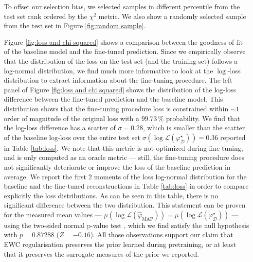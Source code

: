To offset our selection bias, we selected samples in different percentile from the
test set rank ordered by the $\chi^2$ metric. 
We also show a randomly selected sample from the test set in Figure \ref{fig:random sample}.


Figure \ref{fig:loss and chi squared} shows a comparison between 
the goodness of fit of the baseline model and the fine-tuned prediction. 
Since we empirically observe that the distribution of the loss on the test set (and the training set) follows a log-normal distribution, we find much more informative to look at the $\log$-loss 
distribution to extract information about the fine-tuning procedure. 
The left panel of Figure \ref{fig:loss and chi squared} 
shows the distribution of the log-loss difference between the fine-tuned prediction and the baseline model. This distribution shows that the fine-tuning procedure loss is constrained within $\sim 1$ order of magnitude of the original loss with a $99.73\,\%$ probability. We find that the log-loss difference has a scatter of $\sigma = 0.28$, which is smaller than the scatter of the baseline log-loss over the entire test set $\sigma(\log \mathcal{L}(\varphi^\star_{\mathcal{D}})) = 0.36$ reported in Table \ref{tab:loss}.
We note that this metric is not optimized during fine-tuning, 
and is only computed as an oracle metric --- still, the fine-tuning procedure does not significantly deteriorate or improve the loss of the baseline prediction in average. We report the first 2 moments of the loss log-normal distribution for the baseline and the fine-tuned reconstructions in Table \ref{tab:loss} in order to compare explicitly the loss distributions. As can be seen in this table, there is no significant difference between the two distribution. This statement can be proven for the measured mean values --- $\mu(\log \mathcal{L}(\hat{\varphi}_{\mathrm{MAP}})) = \mu(\log \mathcal{L}(\varphi^{\star}_{\mathcal{D}})) $ --- using the two-sided normal p-value test \citep{Casella2001}, which we find satisfy the null hypothesis with $p=0.87288$ ($Z = -0.16$). All those observations support our claim that EWC regularisation preserves the prior learned during pretraining, or at least that it preserves the surrogate measures of the prior we reported. 






